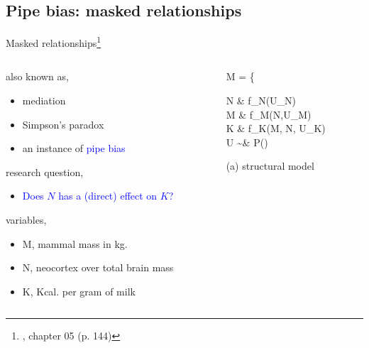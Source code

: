 \subsection{Pipe bias: masked relationships}
%
%
\begin{frame}[t, negative]
	\subsectionpage
\end{frame}
%
%
\begin{frame}
	{Masked relationships\footnote{\citet{McElreath_2020}, chapter 05 (p. 144)}}
	\begin{columns}
		\begin{column}{0.5\textwidth}
			also known as,
			\begin{itemize}
				\item mediation
				\item Simpson's paradox
				\item an instance of \textcolor{blue}{pipe bias}
			\end{itemize}
			
			research question, 
			\begin{itemize}
				\item \textcolor{blue}{Does $N$ has a (direct) effect on $K$?}
			\end{itemize}
			
			variables,
			\begin{itemize}
				\item M, mammal mass in kg.
				\item N, neocortex over total brain mass
				\item K, Kcal. per gram of milk
			\end{itemize}
		\end{column}
		\begin{column}{0.5\textwidth}  
			\begin{equ}
				M = \left\{ \begin{aligned} 
					N \leftarrow & \; f_{N}(U_{N}) \\
					M \leftarrow & \; f_{M}(N,U_{M}) \\
					K \leftarrow & \; f_{K}(M, N, U_{K}) \\
					U \sim & \; P()
				\end{aligned} \right
				\caption*{(a) structural model}
			\end{equ}
			\begin{figure}
\end{figure}
\end{column}
\end{columns}
\end{frame}
